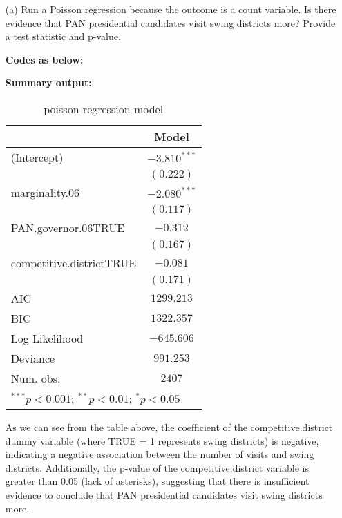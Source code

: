 \documentclass[12pt,a4paper]{article}
\begin{document}
\begin{enumerate}
	\item [(a)]
	Run a Poisson regression because the outcome is a count variable. Is there evidence that PAN presidential candidates visit swing districts more? Provide a test statistic and p-value.
	
			\noindent \textbf{Codes as below:}
	
			\noindent \textbf{Summary output:}
			
	\begin{table}[h]
		\begin{center}
			\begin{tabular}{l c}\hline & Model  \\\hline(Intercept)              & $-3.810^{***}$ \\                         & $(0.222)$      \\marginality.06           & $-2.080^{***}$ \\                         & $(0.117)$      \\PAN.governor.06TRUE      & $-0.312$       \\                         & $(0.167)$      \\competitive.districtTRUE & $-0.081$       \\                         & $(0.171)$      \\\hline AIC                      & $1299.213$     \\BIC                      & $1322.357$     \\Log Likelihood           & $-645.606$     \\Deviance                 & $991.253$      \\Num. obs.                & $2407$         \\\hline\multicolumn{2}{l}{\scriptsize{$^{***}p<0.001$; $^{**}p<0.01$; $^{*}p<0.05$}}
			\end{tabular}\caption{poisson regression model}\label{table:coefficients}
		\end{center}
	\end{table}
	

	
	
	\noindent As we can see from the table above, the coefficient of the competitive.district dummy variable (where TRUE = 1 represents swing districts) is negative, indicating a negative association between the number of visits and swing districts. Additionally, the p-value of the competitive.district variable is greater than 0.05 (lack of asterisks), suggesting that there is insufficient evidence to conclude that PAN presidential candidates visit swing districts more.
	

\end{enumerate}
\end{document}
